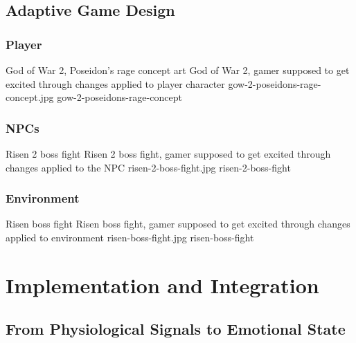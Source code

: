 \documentclass{uofsthesis-cs}
\begin{document}
\section{Adaptive Game Design}
\subsection{Player}

\img
{God of War 2, Poseidon's rage concept art}
{God of War 2, gamer supposed to get excited through changes applied to player character}
{gow-2-poseidons-rage-concept.jpg}
{gow-2-poseidons-rage-concept}

\subsection{NPCs}

\img
{Risen 2 boss fight}
{Risen 2 boss fight, gamer supposed to get excited through changes applied to the NPC}
{risen-2-boss-fight.jpg}
{risen-2-boss-fight}

\subsection{Environment}

\img
{Risen boss fight}
{Risen boss fight, gamer supposed to get excited through changes applied to environment}
{risen-boss-fight.jpg}
{risen-boss-fight}


\chapter{Implementation and Integration}
\label{chap:impl}


\section{From Physiological Signals to Emotional State}
\end{document}
